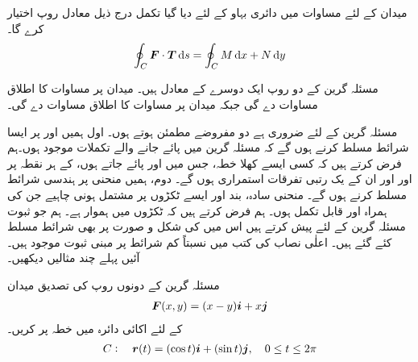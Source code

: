 میدان  کے لئے  مساوات  میں دائری بہاو کے لئے دیا گیا تکمل درج ذیل معادل روپ اختیار کرے گا۔
\begin{align*}
\oint_C\kvec{F}\cdot \kvec{T}\dif s=\oint_C M\dif x+N\dif y
\end{align*}

مسئلہ گرین کے دو روپ ایک دوسرے کے  معادل ہیں۔ میدان  پر مساوات  کا اطلاق مساوات  دے گی جبکہ میدان  پر مساوات  کا اطلاق مساوات  دے گی۔

مسئلہ گرین کے لئے ضروری ہے  دو مفروضے مطمئن ہوتے ہوں۔ اول ہمیں  اور  پر ایسا شرائط مسلط کرنے ہوں گے کہ مسئلہ گرین میں پائے جانے والے تکملات موجود ہوں۔ہم فرض کرتے ہیں کہ کسی ایسے کھلا خطہ، جس میں  اور  پائے جاتے ہوں، کے ہر نقطہ پر  اور  اور ان کے یک رتبی تفرقات استمراری ہوں گے۔ دوم، ہمیں منحنی  پر ہندسی شرائط مسلط کرنے ہوں گے۔ منحنی سادہ، بند اور ایسے  ٹکڑوں پر مشتمل ہونی چاہیے جن کی ہمراہ  اور  قابل تکمل ہوں۔ ہم فرض کرتے ہیں کہ  ٹکڑوں میں ہموار ہے۔ ہم جو ثبوت  مسئلہ گرین کے لئے پیش کرتے ہیں اس میں  کی شکل و صورت پر بھی شرائط مسلط کئے گئے ہیں۔ اعلٰی نصاب کی کتب میں نسبتاً کم شرائط پر مبنی ثبوت موجود ہیں۔ آئیں پہلے چند مثالیں دیکھیں۔

مسئلہ گرین کے دونوں روپ کی تصدیق میدان
\begin{align*}
{\ensuremath{{\boldsymbol{F}}}}(x,y)=(x-y){\boldsymbol{i}}+x{\boldsymbol{j}}
\end{align*}
کے لئے اکائی دائرہ  میں  خطہ  پر کریں۔
\begin{align*}
C:\quad {\ensuremath{{\boldsymbol{r}}}}(t)=(\cos t){\boldsymbol{i}}+(\sin t){\boldsymbol{j}},\quad 0\le t\le 2\pi
\end{align*}
